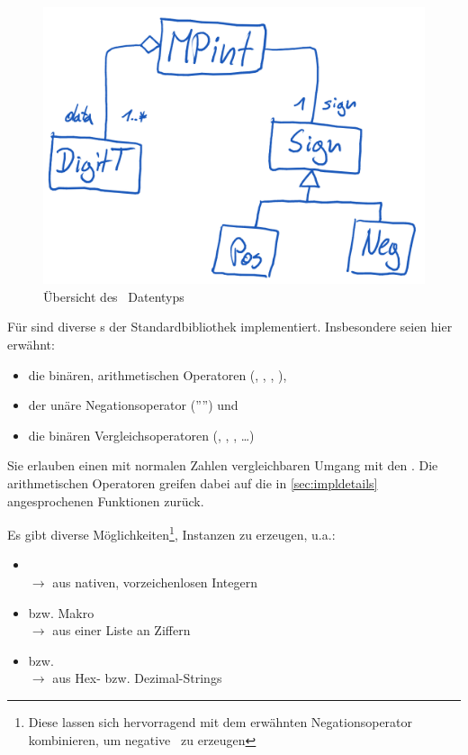             \begin{figure}[H]
                \centering
                \includegraphics[width=0.5\linewidth]{images/cdmpint}
                \caption{Übersicht des \mpi\ Datentyps}
                \label{fig:cdmpint}
            \end{figure}

            Für  sind diverse s der Standardbibliothek implementiert.
            Insbesondere seien hier erwähnt:

            \begin{itemize} \tightlist
                \item die binären, arithmetischen Operatoren (\ilc{+}, \ilc{-}, \ilc{*}, \ilc{+=}),
                \item der unäre Negationsoperator ('''') und
                \item die binären Vergleichsoperatoren (\ilc{==}, \ilc{>}, \ilc{>=}, \dots)
            \end{itemize}

            Sie erlauben einen mit normalen Zahlen vergleichbaren Umgang mit den \mpi{}. Die arithmetischen Operatoren greifen dabei auf die in \autoref{sec:impldetails} angesprochenen Funktionen zurück.

            Es gibt diverse Möglichkeiten\footnote{Diese lassen sich hervorragend mit dem erwähnten Negationsoperator kombinieren, um negative \mpi\ zu erzeugen}, Instanzen zu erzeugen, u.a.:

            \begin{itemize}
                \item
                 \\
                    $\rightarrow$ aus nativen, vorzeichenlosen Integern
                \item
                 bzw. Makro  \\
                    $\rightarrow$ aus einer Liste an Ziffern
                \item
                 bzw.  \\
                    $\rightarrow$ aus Hex- bzw. Dezimal-Strings
            \end{itemize}

